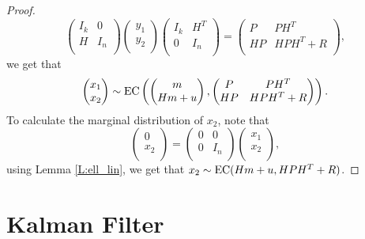 \begin{proof}
\[\begin{pmatrix}
    I_k & 0   \\
    H   & I_n \\
  \end{pmatrix}
  \begin{pmatrix}
    y_1 \\
    y_2 \\
  \end{pmatrix}
  \begin{pmatrix}
    I_k & H^T   \\
    0   & I_n   \\
  \end{pmatrix}
  =
  \begin{pmatrix}
    P    & P H^T     \\
    HP   & HPH^T+R   \\
  \end{pmatrix},
\]
we get that 
\[
  \begin{pmatrix}
    x_1 \\
    x_2 \\
  \end{pmatrix}
  \sim
  \operatorname*{EC} 
    \left(
	  \begin{pmatrix}
        m    \\
        Hm+u \\
      \end{pmatrix},
	  \begin{pmatrix}
        P    & P H^T     \\
        HP   & HPH^T+R   \\
      \end{pmatrix}
    \right).
\]
To calculate the marginal distribution of $x_2$, note that
\[
  \begin{pmatrix}
    0   \\
    x_2 \\
  \end{pmatrix}
  =
  \begin{pmatrix}
    0 & 0    \\
    0 & I_n  \\
  \end{pmatrix}
  \begin{pmatrix}
    x_1 \\
    x_2 \\
  \end{pmatrix},
\]
using Lemma \ref{L:ell_lin}, we get that $x_2\sim \operatorname*{EC}(Hm+u, HPH^T+R)$.
\end{proof}

\section{Kalman Filter}


